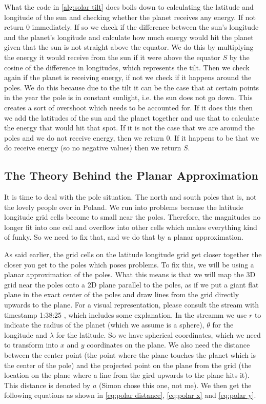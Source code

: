 What the code in \autoref{alg:solar tilt} does boils down to calculating the latitude and longitude of the sun and checking whether the planet receives any energy. If not return $0$ immediately.
If so we check if the difference between the sun's longitude and the planet's longitude and calculate how much energy would hit the planet given that the sun is not straight above the equator. 
We do this by multiplying the energy it would receive from the sun if it were above the equator $S$ by the cosine of the difference in longitudes, which represents the tilt. Then we check again 
if the planet is receiving energy, if not we check if it happens around the poles. We do this because due to the tilt it can be the case that at certain points in the year the pole is in constant
sunlight, i.e. the sun does not go down. This creates a sort of overshoot which needs to be accounted for. If it does this then we add the latitudes of the sun and the planet together and use
that to calculate the energy that would hit that spot. If it is not the case that we are around the poles and we do not receive energy, then we return $0$. If it happens to be that we do receive 
energy (so no negative values) then we return $S$.

\subsection{The Theory Behind the Planar Approximation}
It is time to deal with the pole situation. The north and south poles that is, not the lovely people over in Poland. We run into problems because the latitude longitude grid cells become to small 
near the poles. Therefore, the magnitudes no longer fit into one cell and overflow into other cells which makes everything kind of funky. So we need to fix that, and we do that by a planar 
approximation. 

As said earlier, the grid cells on the latitude longitude grid get closer together the closer you get to the poles which poses problems. To fix this, we will be using a planar approximation of 
the poles. What this means is that we will map the 3D grid near the poles onto a 2D plane parallel to the poles, as if we put a giant flat plane in the exact center of the poles and draw lines
from the grid directly upwards to the plane. For a visual representation, please consult the stream with timestamp 1:38:25 \cite{polarPlane}, which includes some explanation. In the streamm we
use $r$ to indicate the radius of the planet (which we assume is a sphere), $\theta$ for the longitude and $\lambda$ for the latitude. So we have spherical coordinates, which we need to transform
into $x$ and $y$ coordinates on the plane. We also need the distance between the center point (the point where the plane touches the planet which is the center of the pole) and the projected 
point on the plane from the grid (the location on the plane where a line from the gird upwards to the plane hits it). This distance is denoted by $a$ (Simon chose this one, not me). We then get 
the following equations as shown in \autoref{eq:polar distance}, \autoref{eq:polar x} and \autoref{eq:polar y}. 

